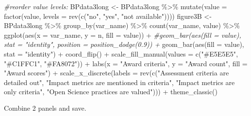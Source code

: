 \documentclass[
]{article}
\newenvironment{Shaded}{\begin{snugshade}}{\end{snugshade}}
\newcommand{\AttributeTok}[1]{\textcolor[rgb]{0.77,0.63,0.00}{#1}}
\newcommand{\CommentTok}[1]{\textcolor[rgb]{0.56,0.35,0.01}{\textit{#1}}}
\newcommand{\FunctionTok}[1]{\textcolor[rgb]{0.00,0.00,0.00}{#1}}
\newcommand{\NormalTok}[1]{#1}
\newcommand{\OtherTok}[1]{\textcolor[rgb]{0.56,0.35,0.01}{#1}}
\newcommand{\SpecialCharTok}[1]{\textcolor[rgb]{0.00,0.00,0.00}{#1}}
\newcommand{\StringTok}[1]{\textcolor[rgb]{0.31,0.60,0.02}{#1}}
\begin{document}
\begin{Shaded}
\begin{Highlighting}[]
\CommentTok{\#reorder value levels:}
\NormalTok{BPdata3long }\OtherTok{\textless{}{-}}\NormalTok{ BPdata3long }\SpecialCharTok{\%\textgreater{}\%} \FunctionTok{mutate}\NormalTok{(}\AttributeTok{value =} \FunctionTok{factor}\NormalTok{(value, }\AttributeTok{levels =} \FunctionTok{rev}\NormalTok{(}\FunctionTok{c}\NormalTok{(}\StringTok{"no"}\NormalTok{,}
                                                                            \StringTok{"yes"}\NormalTok{, }
                                                                            \StringTok{"not available"}\NormalTok{))))}
\NormalTok{figure3B }\OtherTok{\textless{}{-}}\NormalTok{ BPdata3long }\SpecialCharTok{\%\textgreater{}\%} 
  \FunctionTok{group\_by}\NormalTok{(var\_name) }\SpecialCharTok{\%\textgreater{}\%} 
  \FunctionTok{count}\NormalTok{(var\_name, value) }\SpecialCharTok{\%\textgreater{}\%} 
  \FunctionTok{ggplot}\NormalTok{(}\FunctionTok{aes}\NormalTok{(}\AttributeTok{x =}\NormalTok{ var\_name, }\AttributeTok{y =}\NormalTok{ n, }\AttributeTok{fill =}\NormalTok{ value)) }\SpecialCharTok{+}
  \CommentTok{\#geom\_bar(aes(fill = value), stat = "identity", position = position\_dodge(0.9)) +}
  \FunctionTok{geom\_bar}\NormalTok{(}\FunctionTok{aes}\NormalTok{(}\AttributeTok{fill =}\NormalTok{ value), }\AttributeTok{stat =} \StringTok{"identity"}\NormalTok{) }\SpecialCharTok{+}
  \FunctionTok{coord\_flip}\NormalTok{() }\SpecialCharTok{+}
  \FunctionTok{scale\_fill\_manual}\NormalTok{(}\AttributeTok{values =} \FunctionTok{c}\NormalTok{(}\StringTok{"\#E5E5E5"}\NormalTok{, }\StringTok{"\#C1FFC1"}\NormalTok{,  }\StringTok{"\#FA8072"}\NormalTok{)) }\SpecialCharTok{+}
  \FunctionTok{labs}\NormalTok{(}\AttributeTok{x =} \StringTok{"Award criteria"}\NormalTok{, }\AttributeTok{y =} \StringTok{"Award count"}\NormalTok{, }\AttributeTok{fill =} \StringTok{"Award scores"}\NormalTok{) }\SpecialCharTok{+} 
  \FunctionTok{scale\_x\_discrete}\NormalTok{(}\AttributeTok{labels =} \FunctionTok{rev}\NormalTok{(}\FunctionTok{c}\NormalTok{(}\StringTok{"Assessment criteria are detailed out"}\NormalTok{,}
                            \StringTok{"Impact metrics are mentioned in criteria"}\NormalTok{,}
                            \StringTok{"Impact metrics are only criteria"}\NormalTok{, }
                            \StringTok{"Open Science practices are valued"}\NormalTok{))) }\SpecialCharTok{+}
  \FunctionTok{theme\_classic}\NormalTok{()}
\end{Highlighting}
\end{Shaded}

Combine 2 panels and save.
\end{document}
